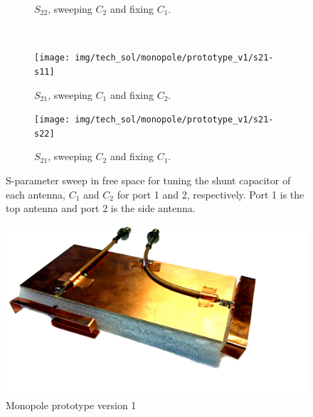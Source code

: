 \begin{figure}[htbp]
\begin{subfigure}[b]{0.49\linewidth}
        \caption{$S_{22}$, sweeping $C_2$ and fixing $C_1$.}
        \label{fig:ant1_s22}
    \end{subfigure}
~
    \begin{subfigure}[b]{0.49\linewidth}
        \centering
        \texttt{[image: img/tech\_sol/monopole/prototype\_v1/s21-s11]}
        \caption{$S_{21}$, sweeping $C_1$ and fixing $C_2$.}
        \label{fig:ant1_s11}
    \end{subfigure}
    \hfill
    \begin{subfigure}[b]{0.49\linewidth}
        \centering
        \texttt{[image: img/tech\_sol/monopole/prototype\_v1/s21-s22]}
        \caption{$S_{21}$, sweeping $C_2$ and fixing $C_1$.}
        \label{fig:ant1_s22}
    \end{subfigure}
    \caption{S-parameter sweep in free space for tuning the shunt capacitor of each antenna, $C_1$ and $C_2$ for port 1 and 2, respectively. Port 1 is the top antenna and port 2 is the side antenna.}
    \label{fig:sparam_mono_sim_proto}
\end{figure}

\begin{figure}
    \centering
    \includegraphics[scale=0.1]{img/tech_sol/monopole/prototype/monopole_v1}
    \caption{Monopole prototype version 1}
    \label{fig:ant1_proto1_3d}
\end{figure}
